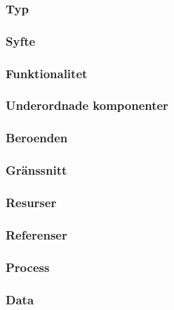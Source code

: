 \subsubsection{Typ}

\subsubsection{Syfte}

\subsubsection{Funktionalitet}

\subsubsection{Underordnade komponenter}

\subsubsection{Beroenden}

\subsubsection{Gränssnitt}

\subsubsection{Resurser}

\subsubsection{Referenser}

\subsubsection{Process}

\subsubsection{Data}
